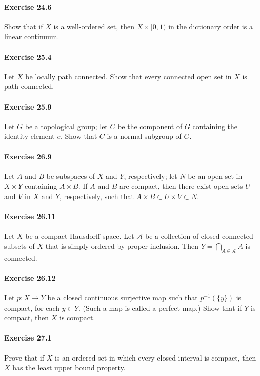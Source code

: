 \documentclass{article}
\begin{document}
\paragraph{Exercise 24.6} Show that if $X$ is a well-ordered set, then $X \times [0, 1)$ in the dictionary order is a linear continuum.

\paragraph{Exercise 25.4} Let $X$ be locally path connected. Show that every connected open set in $X$ is path connected.

\paragraph{Exercise 25.9} Let $G$ be a topological group; let $C$ be the component of $G$ containing the identity element $e$. Show that $C$ is a normal subgroup of $G$.

\paragraph{Exercise 26.9} Let $A$ and $B$ be subspaces of $X$ and $Y$, respectively; let $N$ be an open set in $X \times Y$ containing $A \times B$. If $A$ and $B$ are compact, then there exist open sets $U$ and $V$ in $X$ and $Y$, respectively, such that $A \times B \subset U \times V \subset N .$

\paragraph{Exercise 26.11} Let $X$ be a compact Hausdorff space. Let $\mathcal{A}$ be a collection of closed connected subsets of $X$ that is simply ordered by proper inclusion. Then $Y=\bigcap_{A \in \mathcal{A}} A$ is connected.

\paragraph{Exercise 26.12} Let $p: X \rightarrow Y$ be a closed continuous surjective map such that $p^{-1}(\{y\})$ is compact, for each $y \in Y$. (Such a map is called a perfect map.) Show that if $Y$ is compact, then $X$ is compact.

\paragraph{Exercise 27.1} Prove that if $X$ is an ordered set in which every
closed interval is compact, then $X$ has the least upper bound property.
\end{document}
